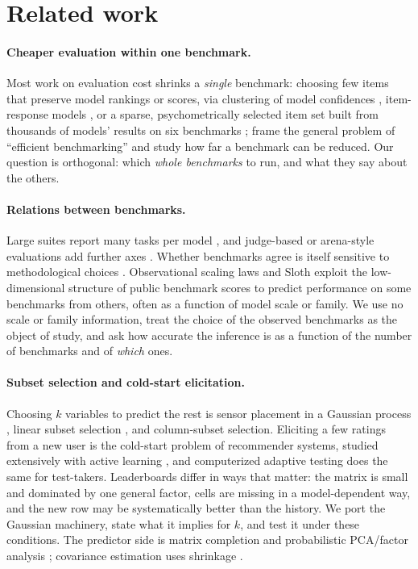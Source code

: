 \section{Related work}
\label{sec:related}

\paragraph{Cheaper evaluation within one benchmark.}
Most work on evaluation cost shrinks a \emph{single} benchmark: choosing few items that preserve model rankings or scores, via clustering of model confidences \citep{vivek2024anchor}, item-response models \citep{polo2024tiny}, or a sparse, psychometrically selected item set built from thousands of models' results on six benchmarks \citep{kipnis2024metabench}; \citet{perlitz2024efficient} frame the general problem of ``efficient benchmarking'' and study how far a benchmark can be reduced. Our question is orthogonal: which \emph{whole benchmarks} to run, and what they say about the others.

\paragraph{Relations between benchmarks.}
Large suites report many tasks per model \citep{hendrycks2020mmlu,muennighoff2022mteb,liang2022helm,zhuo2024bigcodebench}, and judge-based or arena-style evaluations add further axes \citep{zheng2023judging}. Whether benchmarks agree is itself sensitive to methodological choices \citep{perlitz2024benchbench}. Observational scaling laws \citep{ruan2024observational} and Sloth \citep{polo2024sloth} exploit the low-dimensional structure of public benchmark scores to predict performance on some benchmarks from others, often as a function of model scale or family. We use no scale or family information, treat the choice of the observed benchmarks as the object of study, and ask how accurate the inference is as a function of the number of benchmarks and of \emph{which} ones.

\paragraph{Subset selection and cold-start elicitation.}
Choosing $k$ variables to predict the rest is sensor placement in a Gaussian process \citep{krause2008near}, linear subset selection \citep{das2011submodular}, and column-subset selection. Eliciting a few ratings from a new user is the cold-start problem of recommender systems, studied extensively with active learning \citep{elahi2016survey}, and computerized adaptive testing does the same for test-takers. Leaderboards differ in ways that matter: the matrix is small and dominated by one general factor, cells are missing in a model-dependent way, and the new row may be systematically better than the history. We port the Gaussian machinery, state what it implies for $k$, and test it under these conditions. The predictor side is matrix completion \citep{mazumder2010softimpute} and probabilistic PCA/factor analysis \citep{tipping1999ppca}; covariance estimation uses shrinkage \citep{ledoit2004well}.
